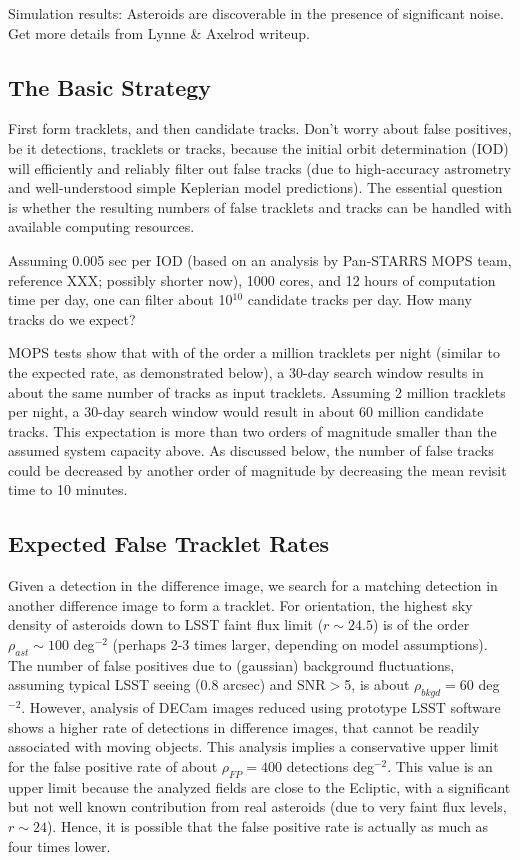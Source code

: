 Simulation results: Asteroids are discoverable in the presence of significant noise.
Get more details from Lynne \& Axelrod writeup. 

\newpage

\subsection{The Basic Strategy} 

First form tracklets, and then candidate tracks. Don't worry about false positives, 
be it detections, tracklets or tracks, because the initial orbit determination (IOD) 
will efficiently and reliably filter out false tracks (due to high-accuracy astrometry 
and well-understood simple Keplerian model predictions). The essential question
is whether the resulting numbers of false tracklets and tracks can be handled with 
available computing resources.

Assuming 0.005 sec per IOD (based on an analysis by Pan-STARRS MOPS team,
reference XXX; possibly shorter now), 1000 cores, and 12 hours of computation time 
per day, one can filter about 10$^{10}$ candidate tracks per day. How many tracks 
do we expect? 

MOPS tests show that with of the order a million tracklets per night (similar to 
the expected rate, as demonstrated below), a 30-day search window results in 
about the same number of tracks as input tracklets. Assuming 2 million tracklets
per night, a 30-day search window would result in about 60 million candidate
tracks. This expectation is more than two orders of magnitude smaller than the 
assumed system capacity above. As discussed below, the number of false tracks
could be decreased by another order of magnitude by decreasing the mean revisit
time to 10 minutes. 


\subsection{Expected False Tracklet Rates} 


Given a detection in the difference image, we search for a matching detection in another
difference image to form a tracklet. For orientation, the highest sky density of asteroids 
down to LSST faint flux limit ($r \sim 24.5$) is of the order $\rho_{ast} \sim 100$ deg$^{-2}$
(perhaps 2-3 times larger, depending on model assumptions). The number of false positives 
due to (gaussian) background fluctuations, assuming typical LSST seeing (0.8 arcsec) and
SNR$>$5, is about $\rho_{bkgd} = 60$ deg$^{-2}$. However, analysis of DECam images reduced 
using prototype LSST software shows a higher rate of detections in difference images, that 
cannot be readily associated with moving objects. This analysis implies a conservative upper
limit for the false positive rate of about $\rho_{FP} =  400$ detections deg$^{-2}$. This value 
is an upper limit because the analyzed fields are close to the Ecliptic, with a significant but
not well known contribution from real asteroids (due to very faint flux levels, $r \sim 24$). 
Hence, it is possible that the false positive rate is actually as much as four times lower. 


